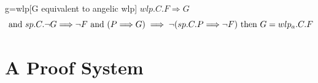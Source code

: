 \begin{corollary}{g=wlp}[G equivalent to angelic wlp]
	 	$wlp.C.F\Longrightarrow G$
	\  \vspace{-3mm}
	\[\hspace{-6mm}
	\\\text{ and } \\ 
	sp.C.\neg G \Longrightarrow \neg F
	\\\text{ and } \\
	(P\Longrightarrow G) \implies \neg(sp.C.P \Longrightarrow \neg F)
	\\\text{ then } \\ 
	G = wlp_a.C.F
	\] 
\end{corollary}


















\newpage
\section{A Proof System}





